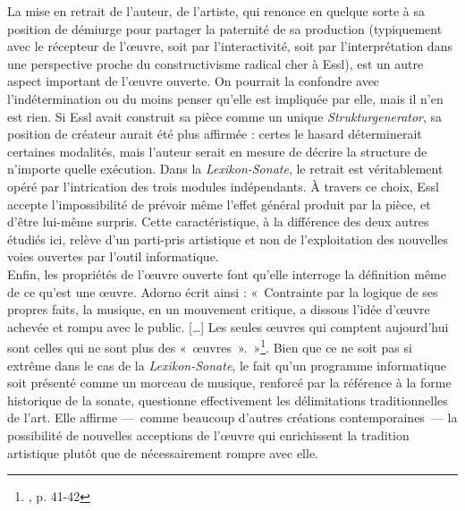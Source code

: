\documentclass[a4paper,12pt]{article}
\newcommand{\guill}[1]{«~#1~»}
\begin{document}
La mise en retrait de l'auteur, de l'artiste, qui renonce en quelque sorte à sa position de démiurge pour partager la paternité de sa production (typiquement avec le récepteur de l'œuvre, soit par l'interactivité, soit par l'interprétation dans une perspective proche du constructivisme radical cher à Essl), est un autre aspect important de l'œuvre ouverte. On pourrait la confondre avec l'indétermination ou du moins penser qu'elle est impliquée par elle, mais il n'en est rien. Si Essl avait construit sa pièce comme un unique \emph{Strukturgenerator}, sa position de créateur aurait été plus affirmée : certes le hasard déterminerait certaines modalités, mais l'auteur serait en mesure de décrire la structure de n'importe quelle exécution. Dans la \emph{Lexikon-Sonate}, le retrait est véritablement opéré par l'intrication des trois modules indépendants. À travers ce choix, Essl accepte l'impossibilité de prévoir même l'effet général produit par la pièce, et d'être lui-même surpris. Cette caractéristique, à la différence des deux autres étudiés ici, relève d'un parti-pris artistique et non de l'exploitation des nouvelles voies ouvertes par l'outil informatique. \\
Enfin, les propriétés de l'œuvre ouverte font qu'elle interroge la définition même de ce qu'est une œuvre. Adorno écrit ainsi : \guill{Contrainte par la logique de ses propres faits, la musique, en un mouvement critique, a dissous l'idée d'œuvre achevée et rompu avec le public. [\dots] Les seules œuvres qui comptent aujourd'hui sont celles qui ne sont plus des \guill{œuvres}.}\footnote{\cite{adorno1949philosophie}, p. 41-42}. Bien que ce ne soit pas si extrême dans le cas de la \emph{Lexikon-Sonate}, le fait qu'un programme informatique soit présenté comme un morceau de musique, renforcé par la référence à la forme historique de la sonate, questionne effectivement les délimitations traditionnelles de l'art. Elle affirme ---~comme beaucoup d'autres créations contemporaines~--- la possibilité de nouvelles acceptions de l'œuvre qui enrichissent la tradition artistique plutôt que de nécessairement rompre avec elle. \\
\end{document}
